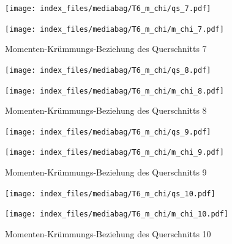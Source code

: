 \documentclass[
  11pt,
  letterpaper,
]{scrreprt}
\begin{document}
\begin{figure}[H]

\begin{minipage}{0.50\linewidth}
\texttt{[image: index\_files/mediabag/T6\_m\_chi/qs\_7.pdf]}\end{minipage}%
%
\begin{minipage}{0.50\linewidth}
\texttt{[image: index\_files/mediabag/T6\_m\_chi/m\_chi\_7.pdf]}\end{minipage}%

\caption{\label{fig-m_chi_appendix}Momenten-Krümmungs-Beziehung des
Querschnitts 7}

\end{figure}%

\begin{figure}[H]

\begin{minipage}{0.50\linewidth}
\texttt{[image: index\_files/mediabag/T6\_m\_chi/qs\_8.pdf]}\end{minipage}%
%
\begin{minipage}{0.50\linewidth}
\texttt{[image: index\_files/mediabag/T6\_m\_chi/m\_chi\_8.pdf]}\end{minipage}%

\caption{\label{fig-m_chi_appendix}Momenten-Krümmungs-Beziehung des
Querschnitts 8}

\end{figure}%

\begin{figure}[H]

\begin{minipage}{0.50\linewidth}
\texttt{[image: index\_files/mediabag/T6\_m\_chi/qs\_9.pdf]}\end{minipage}%
%
\begin{minipage}{0.50\linewidth}
\texttt{[image: index\_files/mediabag/T6\_m\_chi/m\_chi\_9.pdf]}\end{minipage}%

\caption{\label{fig-m_chi_appendix}Momenten-Krümmungs-Beziehung des
Querschnitts 9}

\end{figure}%

\begin{figure}[H]

\begin{minipage}{0.50\linewidth}
\texttt{[image: index\_files/mediabag/T6\_m\_chi/qs\_10.pdf]}\end{minipage}%
%
\begin{minipage}{0.50\linewidth}
\texttt{[image: index\_files/mediabag/T6\_m\_chi/m\_chi\_10.pdf]}\end{minipage}%

\caption{\label{fig-m_chi_appendix}Momenten-Krümmungs-Beziehung des
Querschnitts 10}

\end{figure}%
\end{document}
